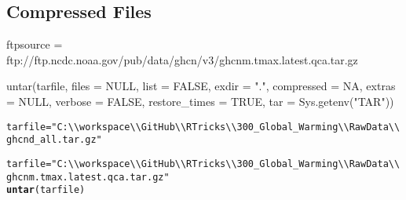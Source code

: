\documentclass{article}\usepackage[]{graphicx}\usepackage[]{color}
\makeatletter
\newcommand{\hlstr}[1]{\textcolor[rgb]{0.192,0.494,0.8}{#1}}%
\newcommand{\hlstd}[1]{\textcolor[rgb]{0.345,0.345,0.345}{#1}}%
\newcommand{\hlkwb}[1]{\textcolor[rgb]{0.69,0.353,0.396}{#1}}%
\newcommand{\hlkwd}[1]{\textcolor[rgb]{0.737,0.353,0.396}{\textbf{#1}}}%
\newenvironment{kframe}{%
 \def\at@end@of@kframe{}%
 \ifinner\ifhmode%
  \def\at@end@of@kframe{\end{minipage}}%
  \begin{minipage}{\columnwidth}%
 \fi\fi%
 \def\FrameCommand##1{\hskip\@totalleftmargin \hskip-\fboxsep
 \colorbox{shadecolor}{##1}\hskip-\fboxsep
     \hskip-\linewidth \hskip-\@totalleftmargin \hskip\columnwidth}%
 \MakeFramed {\advance\hsize-\width
   \@totalleftmargin\z@ \linewidth\hsize
   \@setminipage}}%
 {\par\unskip\endMakeFramed%
 \at@end@of@kframe}
\newenvironment{knitrout}{}{} %
\makeatother
\begin{document}
\subsection{Compressed Files}

ftpsource = ftp://ftp.ncdc.noaa.gov/pub/data/ghcn/v3/ghcnm.tmax.latest.qca.tar.gz


untar(tarfile, files = NULL, list = FALSE, exdir = ".",
      compressed = NA, extras = NULL, verbose = FALSE,
      restore_times =  TRUE, tar = Sys.getenv("TAR"))
      
\begin{knitrout}
\color{fgcolor}\begin{kframe}
\begin{alltt}
\hlstd{tarfile} \hlkwb{=} \hlstr{"C:\textbackslash{}\textbackslash{}workspace\textbackslash{}\textbackslash{}GitHub\textbackslash{}\textbackslash{}RTricks\textbackslash{}\textbackslash{}300_Global_Warming\textbackslash{}\textbackslash{}Raw Data\textbackslash{}\textbackslash{}ghcnd_all.tar.gz"}

\hlstd{tarfile} \hlkwb{=} \hlstr{"C:\textbackslash{}\textbackslash{}workspace\textbackslash{}\textbackslash{}GitHub\textbackslash{}\textbackslash{}RTricks\textbackslash{}\textbackslash{}300_Global_Warming\textbackslash{}\textbackslash{}Raw Data\textbackslash{}\textbackslash{}ghcnm.tmax.latest.qca.tar.gz"}
\hlkwd{untar}\hlstd{(tarfile)}
\end{alltt}


{\ttfamily\noindent{}}

{\ttfamily\noindent\bfseries{}}\end{kframe}
\end{knitrout}

\end{document}

